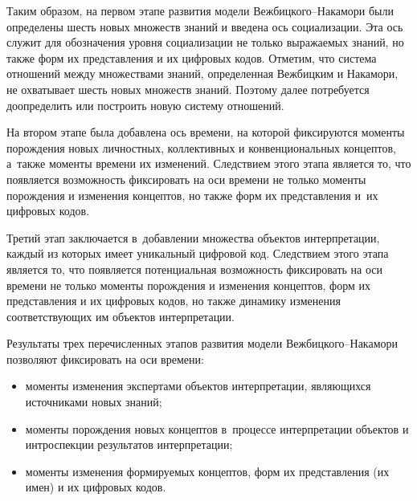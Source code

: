 {\begin{multicols}{2}
      Таким образом, на первом этапе развития модели Веж\-биц\-ко\-го--На\-ка\-мо\-ри 
были определены шесть новых множеств знаний и введена ось социализации. Эта ось 
служит для обозначения уровня социализации не только выражаемых знаний, но также 
форм их представления и их цифровых кодов. Отметим, что система отношений между 
множествами знаний, определенная Вежбицким и Накамори, не охватывает шесть новых 
множеств знаний. Поэтому далее потребуется доопределить или построить новую систему 
отношений.
      
      На втором этапе была добавлена ось времени, на которой фиксируются моменты 
порождения новых личностных, коллективных и конвенциональных концептов, а~также 
моменты времени их изменений. Следствием этого этапа является то, что появляется 
возможность фиксировать на оси времени не только моменты порождения и изменения 
концептов, но также форм их представления и~их цифровых кодов.
      
      Третий этап заключается в~добавлении множества объектов интерпретации, каждый 
из которых имеет уникальный цифровой код. Следствием этого этапа является то, что 
появляется потенциальная возможность фиксировать на оси времени не только моменты 
порождения и изменения концептов, форм их представления и их цифровых кодов, но 
также динамику изменения соответствующих им объектов интерпретации.
      
      Результаты трех перечисленных этапов развития модели 
Веж\-биц\-ко\-го--На\-ка\-мо\-ри позволяют фиксировать на оси времени:
      \begin{itemize}
\item моменты изменения экспертами объектов интерпретации, являющихся 
источниками новых знаний;\\[-14pt]
\item моменты порождения новых концептов в~процессе интерпретации объектов 
и интроспекции результатов интерпретации;\\[-14pt]
\item моменты изменения формируемых концептов, форм их представления (их 
имен) и их цифровых кодов.
\end{itemize}


\end{multicols}}
